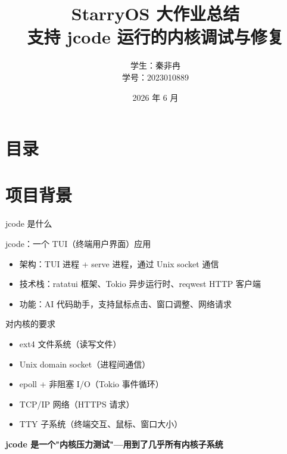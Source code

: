 \documentclass{beamer}
\title[StarryOS 大作业]{StarryOS 大作业总结\\[2mm] 支持 jcode 运行的内核调试与修复}
\author[秦非冉]{学生：秦非冉\\[5mm] 学号：2023010889}
\institute[清华大学]{\small 清华大学}
\date{\small \vskip -10pt 2026 年 6 月}
\begin{document}
\begin{frame}
  \maketitle
\end{frame}

\section*{目录}
\frame{
  \frametitle{\secname}
  \tableofcontents[hideallsubsections]
}

\section{项目背景}

\begin{frame}{jcode 是什么}
  \begin{block}{\small jcode：一个 TUI（终端用户界面）应用}
    \small
    \begin{itemize}
      \setlength{\itemsep}{2pt}
      \item 架构：TUI 进程 + serve 进程，通过 Unix socket 通信
      \item 技术栈：ratatui 框架、Tokio 异步运行时、reqwest HTTP 客户端
      \item 功能：AI 代码助手，支持鼠标点击、窗口调整、网络请求
    \end{itemize}
  \end{block}
  \begin{block}{\small 对内核的要求}
    \small
    \begin{itemize}
      \setlength{\itemsep}{2pt}
      \item ext4 文件系统（读写文件）
      \item Unix domain socket（进程间通信）
      \item epoll + 非阻塞 I/O（Tokio 事件循环）
      \item TCP/IP 网络（HTTPS 请求）
      \item TTY 子系统（终端交互、鼠标、窗口大小）
    \end{itemize}
  \end{block}
  \centering
  \small\textbf{jcode 是一个"内核压力测试"---用到了几乎所有内核子系统}
\end{frame}
\end{document}
